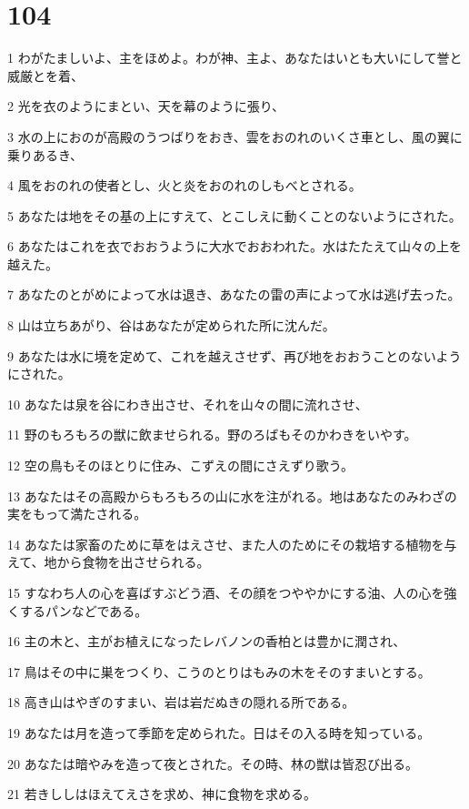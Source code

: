 \chapter{104}

\par 1 わがたましいよ、主をほめよ。わが神、主よ、あなたはいとも大いにして誉と威厳とを着、
\par 2 光を衣のようにまとい、天を幕のように張り、
\par 3 水の上におのが高殿のうつばりをおき、雲をおのれのいくさ車とし、風の翼に乗りあるき、
\par 4 風をおのれの使者とし、火と炎をおのれのしもべとされる。
\par 5 あなたは地をその基の上にすえて、とこしえに動くことのないようにされた。
\par 6 あなたはこれを衣でおおうように大水でおおわれた。水はたたえて山々の上を越えた。
\par 7 あなたのとがめによって水は退き、あなたの雷の声によって水は逃げ去った。
\par 8 山は立ちあがり、谷はあなたが定められた所に沈んだ。
\par 9 あなたは水に境を定めて、これを越えさせず、再び地をおおうことのないようにされた。
\par 10 あなたは泉を谷にわき出させ、それを山々の間に流れさせ、
\par 11 野のもろもろの獣に飲ませられる。野のろばもそのかわきをいやす。
\par 12 空の鳥もそのほとりに住み、こずえの間にさえずり歌う。
\par 13 あなたはその高殿からもろもろの山に水を注がれる。地はあなたのみわざの実をもって満たされる。
\par 14 あなたは家畜のために草をはえさせ、また人のためにその栽培する植物を与えて、地から食物を出させられる。
\par 15 すなわち人の心を喜ばすぶどう酒、その顔をつややかにする油、人の心を強くするパンなどである。
\par 16 主の木と、主がお植えになったレバノンの香柏とは豊かに潤され、
\par 17 鳥はその中に巣をつくり、こうのとりはもみの木をそのすまいとする。
\par 18 高き山はやぎのすまい、岩は岩だぬきの隠れる所である。
\par 19 あなたは月を造って季節を定められた。日はその入る時を知っている。
\par 20 あなたは暗やみを造って夜とされた。その時、林の獣は皆忍び出る。
\par 21 若きししはほえてえさを求め、神に食物を求める。
